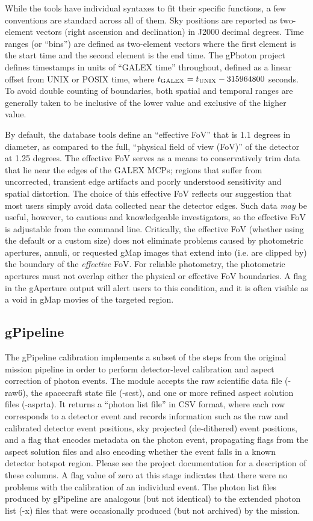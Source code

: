 \documentclass[preprint]{aastex}
\begin{document}
While the tools have individual syntaxes to fit their specific functions, a few conventions are standard across all of them. Sky positions are reported as two-element vectors (right ascension and declination) in J2000 decimal degrees. Time ranges (or ``bins'') are defined as two-element vectors where the first element is the start time and the second element is the end time. The gPhoton project defines timestamps in units of ``GALEX time'' throughout, defined as a linear offset from UNIX or POSIX time, where $t_{\rm{GALEX}} = t_{\rm{UNIX}} - 315964800$ seconds. To avoid double counting of boundaries, both spatial and temporal ranges are generally taken to be inclusive of the lower value and exclusive of the higher value.

By default, the database tools define an ``effective FoV'' that is 1.1 degrees in diameter, as compared to the full, ``physical field of view (FoV)'' of the detector at 1.25 degrees. The effective FoV serves as a means to conservatively trim data that lie near the edges of the GALEX MCPs; regions that suffer from uncorrected, transient edge artifacts and poorly understood sensitivity and spatial distortion. The choice of this effective FoV reflects our suggestion that most users simply avoid data collected near the detector edges. Such data \emph{may} be useful, however, to cautious and knowledgeable investigators, so the effective FoV is adjustable from the command line. Critically, the effective FoV (whether using the default or a custom size) does not eliminate problems caused by photometric apertures, annuli, or requested gMap images that extend into (i.e. are clipped by) the boundary of the \emph{effective} FoV. For reliable photometry, the photometric apertures must not overlap either the physical or effective FoV boundaries. A flag in the gAperture output will alert users to this condition, and it is often visible as a void in gMap movies of the targeted region.

\subsection{gPipeline}
The gPipeline calibration implements a subset of the steps from the original mission pipeline in order to perform detector-level calibration and aspect correction of photon events. The module accepts the raw scientific data file (-raw6), the spacecraft state file (-scst), and one or more refined aspect solution files (-asprta). It returns a ``photon list file'' in CSV format, where each row corresponds to a detector event and records information such as the raw and calibrated detector event positions, sky projected (de-dithered) event positions, and a flag that encodes metadata on the photon event, propagating flags from the aspect solution files and also encoding whether the event falls in a known detector hotspot region. Please see the project documentation for a description of these columns. A flag value of zero at this stage indicates that there were no problems with the calibration of an individual event. The photon list files produced by gPipeline are analogous (but not identical) to the extended photon list (-x) files that were occasionally produced (but not archived) by the mission.
\end{document}
